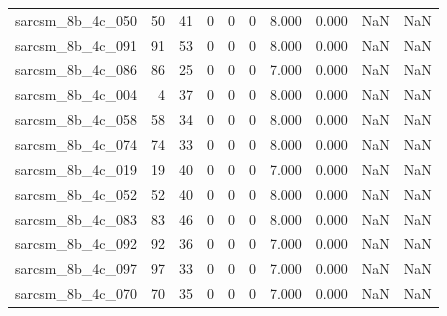 \documentclass{article}
\begin{document}
\begin{longtable}{lrrrrrrrrr}
sarcsm\_8b\_4c\_050 & 50 & 41 & 0 & 0 & 0 & 8.000 & 0.000 & NaN & NaN \\
sarcsm\_8b\_4c\_091 & 91 & 53 & 0 & 0 & 0 & 8.000 & 0.000 & NaN & NaN \\
sarcsm\_8b\_4c\_086 & 86 & 25 & 0 & 0 & 0 & 7.000 & 0.000 & NaN & NaN \\
sarcsm\_8b\_4c\_004 & 4 & 37 & 0 & 0 & 0 & 8.000 & 0.000 & NaN & NaN \\
sarcsm\_8b\_4c\_058 & 58 & 34 & 0 & 0 & 0 & 8.000 & 0.000 & NaN & NaN \\
sarcsm\_8b\_4c\_074 & 74 & 33 & 0 & 0 & 0 & 8.000 & 0.000 & NaN & NaN \\
sarcsm\_8b\_4c\_019 & 19 & 40 & 0 & 0 & 0 & 7.000 & 0.000 & NaN & NaN \\
sarcsm\_8b\_4c\_052 & 52 & 40 & 0 & 0 & 0 & 8.000 & 0.000 & NaN & NaN \\
sarcsm\_8b\_4c\_083 & 83 & 46 & 0 & 0 & 0 & 8.000 & 0.000 & NaN & NaN \\
sarcsm\_8b\_4c\_092 & 92 & 36 & 0 & 0 & 0 & 7.000 & 0.000 & NaN & NaN \\
sarcsm\_8b\_4c\_097 & 97 & 33 & 0 & 0 & 0 & 7.000 & 0.000 & NaN & NaN \\
sarcsm\_8b\_4c\_070 & 70 & 35 & 0 & 0 & 0 & 7.000 & 0.000 & NaN & NaN \\
\end{longtable}
\end{document}
